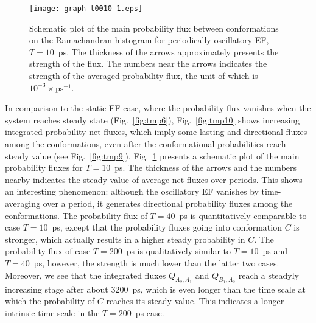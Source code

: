 \documentclass[a4paper,preprint,unsortedaddress,onecolumn]{revtex4-1}
\newcommand{\recheck}[1]{{\color{red} #1}}
\begin{document}
\begin{figure}
  \centering
  \texttt{[image: graph-t0010-1.eps]}
  \caption{Schematic plot of the main probability flux between conformations
    on the Ramachandran histogram
    for periodically oscillatory EF, $T=10$~ps. The thickness 
    of the arrows approximately presents the strength of the flux.
    The numbers near the arrows indicates the strength of the averaged
    probability flux, the unit of which is $10^{-3}\times\textrm{ps}^{-1}$.
  }
  \label{fig:tmp11}
\end{figure}
\recheck{
In comparison to the static EF case, where the probability flux
vanishes when the system reaches steady state (Fig.~\ref{fig:tmp6}), 
Fig.~\ref{fig:tmp10} shows increasing
integrated probability net fluxes, which imply some lasting and directional
fluxes among the conformations, even after the
conformational probabilities reach steady value (see Fig.~\ref{fig:tmp9}).
}
Fig.~\ref{fig:tmp11} presents
a schematic plot of the main probability fluxes for $T=10$~ps.
The thickness of the arrows and the numbers nearby indicates
\recheck{the steady value of average net fluxes over periods}.
\recheck{This shows an interesting phenomenon: although
the oscillatory EF vanishes by time-averaging over a period,
it generates directional probability fluxes among the conformations.}
The probability flux of $T=40$~ps is quantitatively
comparable to case $T=10$~ps, except that the probability fluxes
going into conformation $C$ is stronger, which actually results in
a higher steady probability in $C$.
The probability flux of case $T=200$~ps is qualitatively
similar to $T=10$~ps and $T=40$~ps, however,
the strength is much lower than the latter two cases.
Moreover, \recheck{
  we see that the integrated fluxes $Q_{A_2,A_1}$ and $Q_{B_1,A_2}$ reach
  a steadyly
increasing stage after about 3200~ps}, which is even longer than the time scale
at which the probability of $C$ reaches its steady value. This indicates
a longer intrinsic time scale in the $T=200$~ps case.
\end{document}
